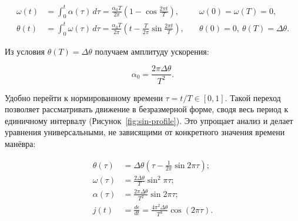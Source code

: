 \begin{equation}
	\begin{aligned}
		\omega(t) &= \int_{0}^{t} \alpha(\tau)\, d\tau
		= \frac{\alpha_0 T}{2 \pi} \!\left( 1 - \cos \frac{2 \pi t}{T} \right),
		&\quad \omega(0) = \omega(T) = 0, \\[6pt]
		\theta(t) &= \int_{0}^{t} \omega(\tau)\, d\tau
		= \frac{\alpha_0 T}{2 \pi} \!\left( t - \frac{T}{2 \pi} \sin \frac{2 \pi t}{T} \right),
		&\quad \theta(0) = 0,\ \theta(T) = \Delta \theta.
	\end{aligned}
\end{equation}


Из условия $\theta(T) = \Delta \theta$ получаем амплитуду ускорения:

\begin{equation}
	\alpha_{0} = \frac{2 \pi \Delta \theta}{T^{2}}.
\end{equation}

Удобно перейти к нормированному времени $\tau=t/T \in [0,1]$. Такой переход позволяет рассматривать движение в безразмерной форме, сводя весь период к единичному интервалу (Рисунок~\cref{fig:sin-profile}). Это упрощает анализ и делает уравнения универсальными, не зависящими от конкретного значения времени манёвра:

\begin{equation}
	\begin{aligned}
		\theta(\tau) &= \Delta \theta \!\left( \tau - \frac{1}{2 \pi} \sin 2 \pi \tau \right); \\
		\omega(\tau) &= \frac{2 \Delta \theta}{T} \sin^{2} \pi \tau; \\
		\alpha(\tau) &= \frac{2 \pi \Delta \theta}{T^{2}} \sin 2 \pi \tau; \\
		j(t) &= \frac{d \epsilon}{d t} = \frac{4 \pi^{2} \Delta \theta}{T^{3}} \cos\!\left(2 \pi \tau\right).\\
	\end{aligned}
\end{equation}

